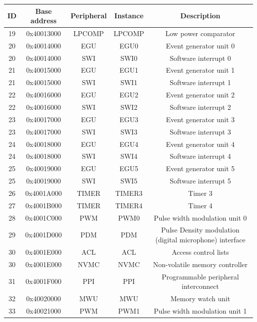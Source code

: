 \begin{table}[H]
    \centering
    \scriptsize
    \begin{tabular}{|c|c|c|c|c|}
        \hline
        \textbf{ID} & \textbf{Base address} & \textbf{Peripheral} & \textbf{Instance} & \textbf{Description} \\
        \hline
        19 & 0x40013000 & LPCOMP & LPCOMP & Low power comparator \\
        20 & 0x40014000 & EGU & EGU0 & Event generator unit 0 \\
        20 & 0x40014000 & SWI & SWI0 & Software interrupt 0 \\
        21 & 0x40015000 & EGU & EGU1 & Event generator unit 1 \\
        21 & 0x40015000 & SWI & SWI1 & Software interrupt 1 \\
        22 & 0x40016000 & EGU & EGU2 & Event generator unit 2 \\
        22 & 0x40016000 & SWI & SWI2 & Software interrupt 2 \\
        23 & 0x40017000 & EGU & EGU3 & Event generator unit 3 \\
        23 & 0x40017000 & SWI & SWI3 & Software interrupt 3 \\
        24 & 0x40018000 & EGU & EGU4 & Event generator unit 4 \\
        24 & 0x40018000 & SWI & SWI4 & Software interrupt 4 \\
        25 & 0x40019000 & EGU & EGU5 & Event generator unit 5 \\
        25 & 0x40019000 & SWI & SWI5 & Software interrupt 5 \\
        26 & 0x4001A000 & TIMER & TIMER3 & Timer 3 \\
        27 & 0x4001B000 & TIMER & TIMER4 & Timer 4 \\
        28 & 0x4001C000 & PWM & PWM0 & Pulse width modulation unit 0 \\
        29 & 0x4001D000 & PDM & PDM & Pulse Density modulation (digital microphone) interface \\
        30 & 0x4001E000 & ACL & ACL & Access control lists \\
        30 & 0x4001E000 & NVMC & NVMC & Non-volatile memory controller \\
        31 & 0x4001F000 & PPI & PPI & Programmable peripheral interconnect \\
        32 & 0x40020000 & MWU & MWU & Memory watch unit \\
        33 & 0x40021000 & PWM & PWM1 & Pulse width modulation unit 1 \\

\end{tabular}
\end{table}

